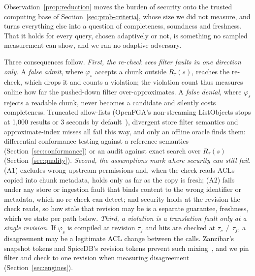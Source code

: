 Observation~\ref{prop:reduction} moves the burden of security onto the trusted computing base of
Section~\ref{sec:prob-criteria}, whose size we did not measure, and turns everything else into a question of completeness, soundness and freshness.
That it holds for every query, chosen adaptively or not, is something no sampled measurement can show, and we ran no adaptive adversary.

Three consequences follow. \emph{First, the re-check sees filter faults in one direction only.} A
\emph{false admit}, where $\varphi_s$ accepts a chunk outside $R_\tau(s)$, reaches the re-check, which
drops it and counts a violation; the violation count thus measures online how far the pushed-down
filter over-approximates. A \emph{false denial}, where $\varphi_s$ rejects a readable chunk, never
becomes a candidate and silently costs completeness. Truncated allow-lists (OpenFGA's non-streaming
ListObjects stops at 1,000 results or 3 seconds by default~\cite{openfga2026openfga}), divergent store
filter semantics and approximate-index misses all fail this way, and only an offline oracle finds
them: differential conformance testing against a reference semantics
(Section~\ref{sec:conformance}) or an audit against exact search over $R_\tau(s)$
(Section~\ref{sec:quality}). \emph{Second, the assumptions mark where security can still fail.} (A1)
excludes wrong upstream permissions and, when the check reads ACLs copied into chunk metadata, holds
only as far as the copy is fresh; (A2) fails under any store or ingestion fault that binds content to
the wrong identifier or metadata, which no re-check can detect; and security holds at the revision
the check reads, so how stale that revision may be is a separate guarantee, freshness, which we
state per path below. \emph{Third, a violation is a translation fault only at a single revision.} If
$\varphi_s$ is compiled at revision $\tau_f$ and hits are checked at $\tau_c \neq \tau_f$, a
disagreement may be a legitimate ACL change between the calls. Zanzibar's snapshot tokens and
SpiceDB's revision tokens prevent such mixing~\cite{pang2019zanzibar,authzed2026protecting}, and we pin
filter and check to one revision when measuring disagreement (Section~\ref{sec:engines}).

